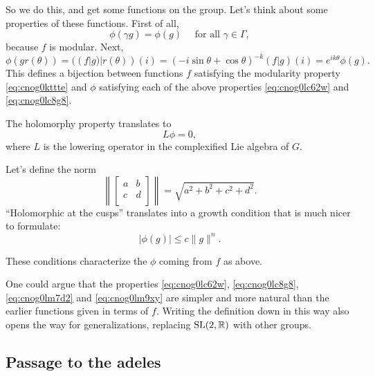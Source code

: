 \documentclass[reqno]{amsart} 
\begin{document}
So we do this, and get some functions on the group.  Let's think about some properties of these functions.  First of all,
\begin{equation}\label{eq:cnog0lc62w}
  \phi(\gamma g) = \phi(g) \quad \text{ for all } \gamma \in \Gamma,
\end{equation}
because $f$ is modular.  Next,
\begin{equation}\label{eq:cnog0lc8g8}
  \phi(g r(\theta)) =((f | g) | r(\theta) )(i)
  =
  (-i \sin \theta + \cos \theta)^{- k}
  (f|g)(i)
  = e^{i k \theta} \phi(g).
\end{equation}
This defines a bijection between functions $f$ satisfying the modularity property \eqref{eq:cnog0kttte} and $\phi$ satisfying each of the above properties \eqref{eq:cnog0lc62w} and \eqref{eq:cnog0lc8g8}.

The holomorphy property translates to
\begin{equation}\label{eq:cnog0lm7d2}
  L \phi = 0,
\end{equation}
where $L$ is the lowering operator in the complexified Lie algebra of $G$.

Let's define the norm
\begin{equation*}
  \left\lVert
    \begin{bmatrix}
    a    & b \\
    c & d \\
    \end{bmatrix}
  \right\rVert
  = \sqrt{a^2 + b^2 + c^2 + d^2}.
\end{equation*}
``Holomorphic at the cusps'' translates into a growth condition that is much nicer to formulate:
\begin{equation}\label{eq:cnog0lm9xy}
  \lvert \phi(g) \rvert \leq c \lVert g \rVert^n.
\end{equation}

These conditions characterize the $\phi$ coming from $f$ as above.

One could argue that the properties \eqref{eq:cnog0lc62w}, \eqref{eq:cnog0lc8g8}, \eqref{eq:cnog0lm7d2} and \eqref{eq:cnog0lm9xy} are simpler and more natural than the earlier functions given in terms of $f$.  Writing the definition down in this way also opens the way for generalizations, replacing $\operatorname{SL}(2,\mathbb{R})$ with other groups.

\subsection{Passage to the adeles}
\end{document}
